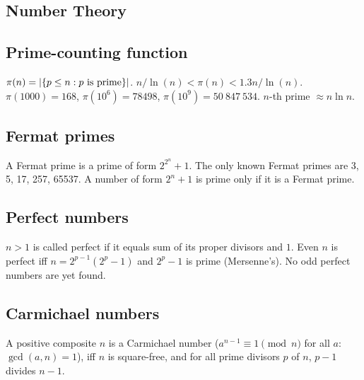 \documentclass[12pt]{extarticle}
\begin{document}
\begin{multicols*}{2}


\section{Number Theory}


\subsection{Prime-counting function} $\pi(n) = |\{p \le n : p \hbox{ is prime}\}|$.
$n/\ln(n) < \pi(n) < 1.3 n/\ln(n)$.
$\pi(1000) = 168$, $\pi(10^6) = 78498$, $\pi(10^9) = 50\ 847\ 534$.
\quad $n$-th prime $\approx n \ln n$.

\subsection{Fermat primes}  A Fermat prime is a prime of form $2^{2^n}+1$.
The only known Fermat primes are 3, 5, 17, 257, 65537.
A number of form $2^n+1$ is prime only if it is a Fermat prime.


\subsection{Perfect numbers}  $n>1$ is called perfect if it equals
sum of its proper divisors and $1$.  Even $n$ is perfect iff $n = 2^{p-1} (2^p - 1)$
and $2^p - 1$ is prime (Mersenne's). No odd perfect numbers are yet found.

\subsection{Carmichael numbers}
A positive composite $n$ is a Carmichael number
($a^{n-1} \equiv 1 \pmod{n}$ for all $a$: $\gcd(a,n)=1$),
iff $n$ is square-free, and for all prime divisors $p$ of $n$, $p-1$ divides $n-1$.


\end{multicols*}
\end{document}

